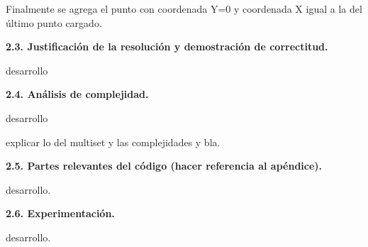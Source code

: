 Finalmente se agrega el punto con coordenada Y=0 y coordenada X igual a la del
último punto cargado.


\vspace*{0.75cm} \noindent


\noindent
\textbf{2.3. Justificación de la resolución y demostración de correctitud.}

\vspace*{0.3cm}

desarrollo



\vspace*{0.75cm} \noindent



\noindent
\textbf{2.4. Análisis de complejidad.}

\vspace*{0.3cm}



desarrollo


explicar lo del multiset y las complejidades y bla.


\vspace*{0.75cm} \noindent



\noindent
\textbf{2.5. Partes relevantes del código (hacer referencia al apéndice).}

\vspace*{0.3cm}

desarrollo.


\vspace*{0.75cm} \noindent



\noindent
\textbf{2.6. Experimentación.}

\vspace*{0.3cm}

desarrollo.

